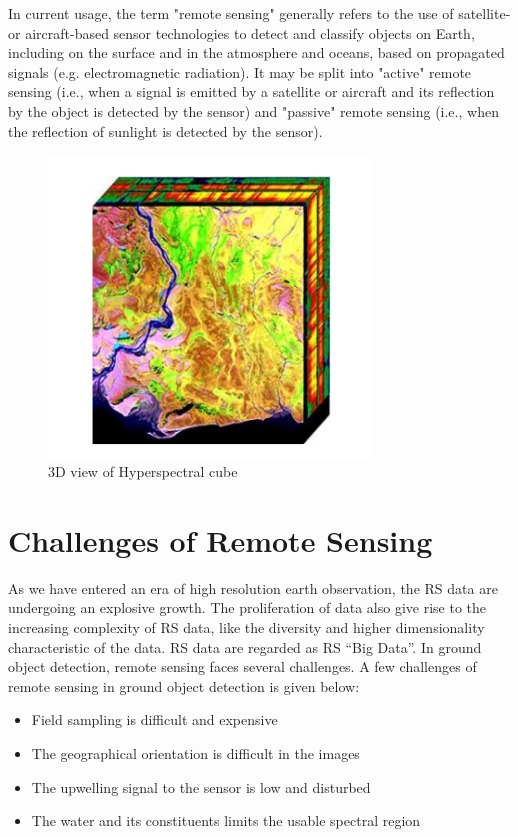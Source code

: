 \documentclass[document.tex]{subfiles}
\begin{document}
\noindent In current usage, the term "remote sensing" generally refers to the use of satellite- or aircraft-based sensor technologies to detect and classify objects on Earth, including on the surface and in the atmosphere and oceans, based on propagated signals (e.g. electromagnetic radiation). It may be split into "active" remote sensing (i.e., when a signal is emitted by a satellite or aircraft and its reflection by the object is detected by the sensor) and "passive" remote sensing (i.e., when the reflection of sunlight is detected by the sensor).
\begin{figure}[H]
	\begin{center}
		\includegraphics[height=8.0cm]{imgs/cube.png}
	\end{center}
	\caption{3D view
		of Hyperspectral cube\cite{31}}
	\label{3D view 
		of Hyperspectral cube}
\end{figure}

\section{Challenges of Remote Sensing}
\noindent As we have entered an era of high resolution earth observation, the RS data are undergoing an explosive growth. The proliferation of data also give rise to the increasing complexity of RS data, like the diversity and higher dimensionality characteristic of the data. RS data are regarded as RS “Big Data”. In ground object detection, remote sensing faces several challenges. A few challenges of remote sensing in ground object detection is given below:
\begin{itemize}
	\item Field sampling is difficult and expensive
	\item The geographical orientation is difficult in the images
	\item The upwelling signal to the sensor is low and disturbed
	\item The water and its constituents limits the usable spectral region
\end{itemize}
\end{document}
